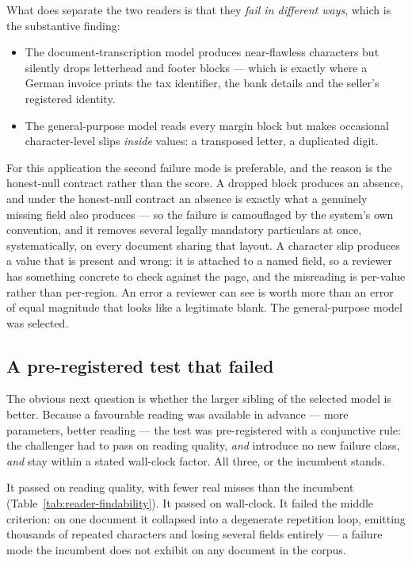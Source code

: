 What does separate the two readers is that they \emph{fail in different ways},
which is the substantive finding:

\begin{itemize}
  \item The document-transcription model produces near-flawless characters but silently drops
        letterhead and footer blocks --- which is exactly where a German invoice prints the
        tax identifier, the bank details and the seller's registered identity.
  \item The general-purpose model reads every margin block but makes occasional
        character-level slips \emph{inside} values: a transposed letter, a duplicated digit.
\end{itemize}

For this application the second failure mode is preferable, and the reason is the honest-null
contract rather than the score. A dropped block produces an absence, and under the honest-null
contract an absence is exactly what a genuinely missing field also produces --- so the failure
is camouflaged by the system's own convention, and it removes several legally mandatory
particulars at once, systematically, on every document sharing that layout. A character slip
produces a value that is present and wrong: it is attached to a named field, so a reviewer has
something concrete to check against the page, and the misreading is per-value rather than
per-region. An error a reviewer can see is worth more than an error of equal magnitude that
looks like a legitimate blank. The general-purpose model was selected.

\subsection{A pre-registered test that failed}

The obvious next question is whether the larger sibling of the selected model is better. Because
a favourable reading was available in advance --- more parameters, better reading --- the test
was pre-registered with a conjunctive rule: the challenger had to pass on reading quality,
\emph{and} introduce no new failure class, \emph{and} stay within a stated wall-clock factor.
All three, or the incumbent stands.

It passed on reading quality, with fewer real misses than the incumbent
(Table~\ref{tab:reader-findability}). It passed on wall-clock. It failed the middle criterion:
on one document it collapsed into a degenerate repetition loop, emitting thousands of repeated
characters and losing several fields entirely --- a failure mode the incumbent does not exhibit
on any document in the corpus.

